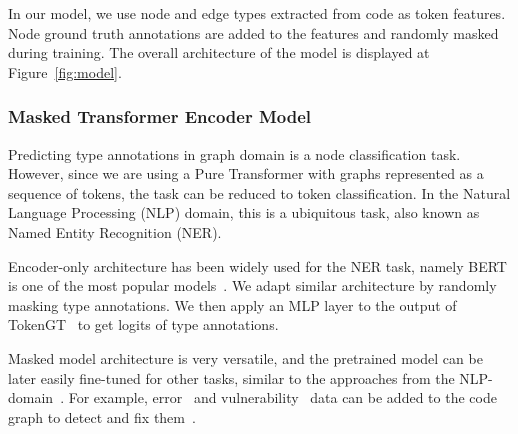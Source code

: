 \begin{figure*}
    \resizebox{\textwidth}{!}{}
    \caption{GraphTyper Architecture. The source code is first transformed into AST graph, then type annotations are randomely masked. The graph is enriched by token type identifiers (node or edge) and orthonormal node identifiers obtained from eigendecomposition of Laplacian matrix. The resulting graph is fed through a Transformer Encoder to obtain type annotations for masked nodes.}
    \label{fig:model}
\end{figure*}

In our model, we use node and edge types extracted from code as token features.
Node ground truth annotations are added to the features and randomly masked during training.
The overall architecture of the model is displayed at Figure~\ref{fig:model}.

\subsubsection{Masked Transformer Encoder Model}

Predicting type annotations in graph domain is a node classification task.
However, since we are using a Pure Transformer with graphs represented as a sequence of tokens, the task can be reduced to token classification.
In the Natural Language Processing (NLP) domain, this is a ubiquitous task, also known as Named Entity Recognition (NER).

Encoder-only architecture has been widely used for the NER task, namely BERT is one of the most popular models~\cite{liu2021nerbert,Darji_2023}.
We adapt similar architecture by randomly masking type annotations.
We then apply an MLP layer to the output of TokenGT~\cite{kim_pure_2022} to get logits of type annotations.

Masked model architecture is very versatile, and the pretrained model can be later easily fine-tuned for other tasks,
similar to the approaches from the NLP-domain~\cite{liu2021nerbert}.
For example, error~\cite{bieber2022static} and vulnerability~\cite{sun2023exploring} data can be added to the code graph to detect and fix them~\cite{nguyen_regvd_2021,li_vuldeepecker_2018,cao_bgnn4vd_2021,li_sysevr_2021,russell_automated_2018}.